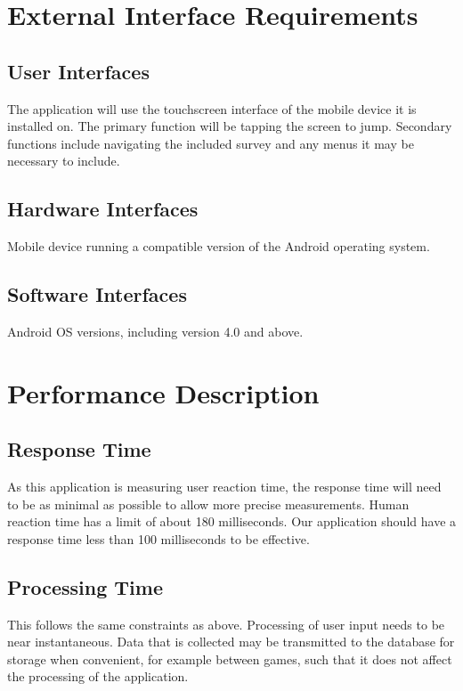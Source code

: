 \documentclass[a4wide]{article}
\begin{document}

\section{External Interface Requirements}

\subsection{User Interfaces}

The application will use the touchscreen interface of the mobile device it is
installed on.  The primary function will be tapping the screen to jump.
Secondary functions include navigating the included survey and any menus it may
be necessary to include.

\subsection{Hardware Interfaces}

Mobile device running a compatible version of the Android operating system.


\subsection{Software Interfaces}

Android OS versions, including version 4.0 and above.



\section{Performance Description}

\subsection{Response Time}
As this application is measuring user reaction time, the response time will need
to be as minimal as possible to allow more precise measurements.  Human reaction
time has a limit of about 180 milliseconds.  Our application should have a
response time less than 100 milliseconds to be effective.

\subsection{Processing Time}
This follows the same constraints as above.  Processing of user input needs to
be near instantaneous.  Data that is collected may be transmitted to the
database for storage when convenient, for example between games, such that it
does not affect the processing of the application.
\end{document}
